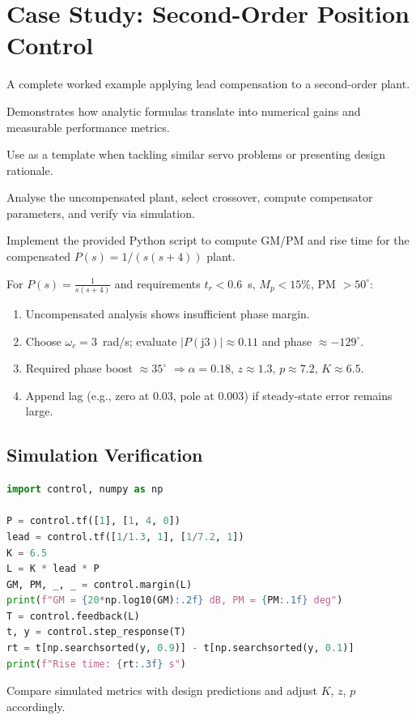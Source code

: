 \section{Case Study: Second-Order Position Control}
\begin{beginnerguide}
    \item[\textbf{What?}] A complete worked example applying lead compensation to a second-order plant.
    \item[\textbf{Why?}] Demonstrates how analytic formulas translate into numerical gains and measurable performance metrics.
    \item[\textbf{When?}] Use as a template when tackling similar servo problems or presenting design rationale.
    \item[\textbf{How?}] Analyse the uncompensated plant, select crossover, compute compensator parameters, and verify via simulation.
    \item[\textbf{Example}] Implement the provided Python script to compute GM/PM and rise time for the compensated $P(s)=1/(s(s+4))$ plant.
\end{beginnerguide}
For $P(s) = \tfrac{1}{s(s+4)}$ and requirements $t_r < 0.6$~s, $M_p < 15\%$, PM $> 50^\circ$:
\begin{enumerate}[leftmargin=*]
    \item Uncompensated analysis shows insufficient phase margin.
    \item Choose $\omega_c = 3$~rad/s; evaluate $|P(\mathrm{j}3)| \approx 0.11$ and phase $\approx -129^\circ$.
    \item Required phase boost $\approx 35^\circ$ $\Rightarrow \alpha = 0.18$, $z \approx 1.3$, $p \approx 7.2$, $K \approx 6.5$.
    \item Append lag (e.g., zero at $0.03$, pole at $0.003$) if steady-state error remains large.
\end{enumerate}

\subsection{Simulation Verification}
\begin{lstlisting}[language=python]
import control, numpy as np

P = control.tf([1], [1, 4, 0])
lead = control.tf([1/1.3, 1], [1/7.2, 1])
K = 6.5
L = K * lead * P
GM, PM, _, _ = control.margin(L)
print(f"GM = {20*np.log10(GM):.2f} dB, PM = {PM:.1f} deg")
T = control.feedback(L)
t, y = control.step_response(T)
rt = t[np.searchsorted(y, 0.9)] - t[np.searchsorted(y, 0.1)]
print(f"Rise time: {rt:.3f} s")
\end{lstlisting}
Compare simulated metrics with design predictions and adjust $K$, $z$, $p$ accordingly.

